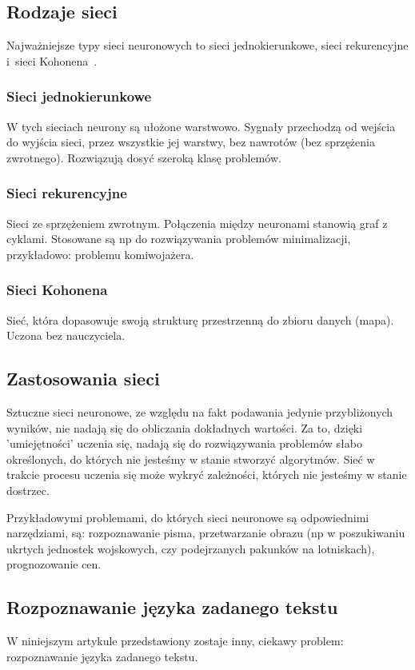 \documentclass[journal]{IEEEtran}
\begin{document}
\subsection{Rodzaje sieci}
Najważniejsze typy sieci neuronowych to sieci jednokierunkowe, sieci rekurencyjne i~sieci Kohonena~\cite{wiki:sieci}.

\subsubsection{Sieci jednokierunkowe}
W tych sieciach neurony są ułożone warstwowo. Sygnały przechodzą od wejścia do wyjścia sieci, przez wszystkie jej
warstwy, bez nawrotów (bez sprzężenia zwrotnego). Rozwiązują dosyć szeroką klasę problemów.

\subsubsection{Sieci rekurencyjne}
Sieci ze sprzężeniem zwrotnym. Połączenia między neuronami stanowią graf z cyklami. Stosowane są np do rozwiązywania
problemów minimalizacji, przykładowo: problemu komiwojażera.

\subsubsection{Sieci Kohonena}
Sieć, która dopasowuje swoją strukturę przestrzenną do zbioru danych (mapa). Uczona bez nauczyciela.


\subsection{Zastosowania sieci}
Sztuczne sieci neuronowe, ze względu na fakt podawania jedynie przybliżonych wyników, nie nadają się do obliczania
dokładnych wartości. Za to, dzięki 'umiejętności' uczenia się, nadają się do rozwiązywania problemów słabo określonych,
do których nie jesteśmy w stanie stworzyć algorytmów. Sieć w trakcie procesu uczenia się może wykryć zależności,
których nie jesteśmy w stanie dostrzec.

Przykładowymi problemami, do których sieci neuronowe są odpowiednimi
narzędziami, są: rozpoznawanie pisma, przetwarzanie obrazu (np w poszukiwaniu ukrtych jednostek wojskowych, czy
podejrzanych pakunków na lotniskach), prognozowanie cen.


\subsection{Rozpoznawanie języka zadanego tekstu}
W niniejszym artykule przedstawiony zostaje inny, ciekawy problem: rozpoznawanie języka zadanego tekstu.
\end{document}

